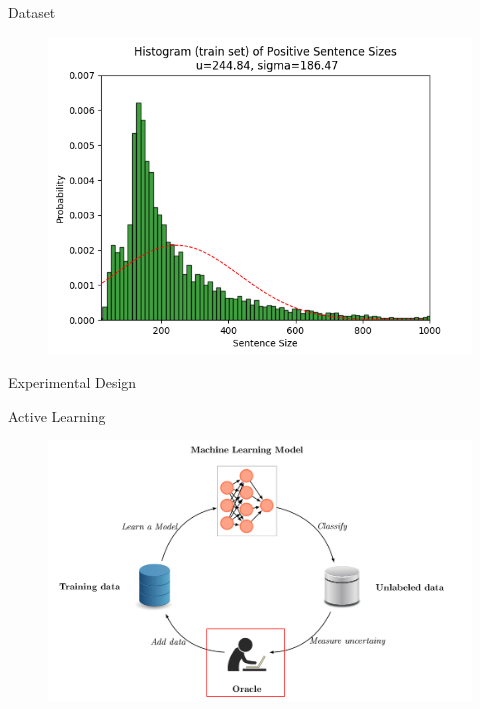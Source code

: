 \documentclass[10pt]{beamer}
\begin{document}
\begin{frame}[fragile]{Dataset}
    \begin{figure}[htp]
        \centering
        \includegraphics[scale=0.6]{images/train_positive_graph.png}
    \end{figure}
\end{frame}

\begin{frame}[fragile]{Experimental Design}
    
\end{frame}

\begin{frame}[fragile]{Active Learning}
    \begin{figure}[htp]
        \centering
        \includegraphics[scale=0.3]{images/active_learning_oracle.png}
    \end{figure}
\end{frame}
\end{document}
